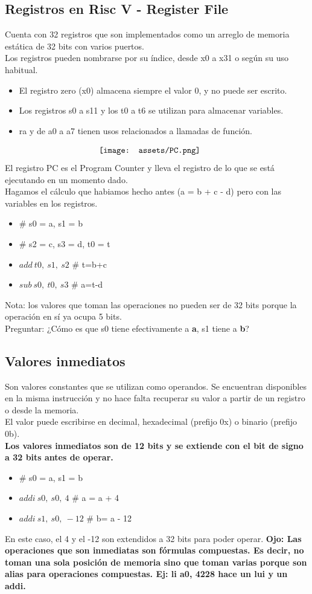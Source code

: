 \documentclass[10pt,a4paper]{article}
\begin{document}
\subsection*{Registros en Risc V - Register File}
Cuenta con 32 registros que son implementados como un arreglo de memoria estática de 32 bits con varios puertos. \\
Los registros pueden nombrarse por su índice, desde x0 a x31 o según su uso habitual.
\begin{itemize}
    \item El registro zero (x0) almacena siempre el valor 0, y no puede ser escrito.
    \item Los registros s0 a s11 y los t0 a t6 se utilizan para almacenar variables.
    \item ra y de a0 a a7 tienen usos relacionados a llamadas de función.
\end{itemize}
\[\begin{minipage}[b]{0.4\textwidth}
    \texttt{[image: assets/PC.png]}
    \label{fig:PC}
\end{minipage}\]
El registro PC es el Program Counter y lleva el registro de lo que se está ejecutando en un momento dado. \\
Hagamos el cálculo que habiamos hecho antes (a = b + c - d) pero con las variables en los registros.
\begin{itemize}
    \item \# s0 = a, s1 = b
    \item \# s2 = c, s3 = d, t0 = t
    \item \(add \ t0,\ s1,\ s2\) \# t=b+c
    \item \(sub \ s0,\ t0, \ s3\) \# a=t-d
\end{itemize}
Nota: los valores que toman las operaciones no pueden ser de 32 bits porque la operación en sí ya ocupa 5 bits. \\
Preguntar: ¿Cómo es que s0 tiene efectivamente a \textbf{a}, s1 tiene a \textbf{b}?
\subsection*{Valores inmediatos}
Son valores constantes que se utilizan como operandos. Se encuentran disponibles en la misma instrucción y no hace falta recuperar su valor a partir de un registro o desde la memoria. \\
El valor puede escribirse en decimal, hexadecimal (prefijo 0x) o binario (prefijo 0b). \\
\textbf{Los valores inmediatos son de 12 bits y se extiende con el bit de signo a 32 bits antes de operar.}
\begin{itemize}
    \item \# s0 = a, s1 = b
    \item \(addi \ s0,\ s0,\ 4\) \# a = a + 4
    \item \(addi \ s1,\ s0, \ -12\) \# b= a - 12
\end{itemize}
En este caso, el 4 y el -12 son extendidos a 32 bits para poder operar. 
\textbf{Ojo: Las operaciones que son inmediatas son fórmulas compuestas. Es decir, no toman una sola posición de memoria sino que toman varias porque son alias para operaciones compuestas. Ej: li a0, 4228 hace un lui y un addi.}
\end{document}
